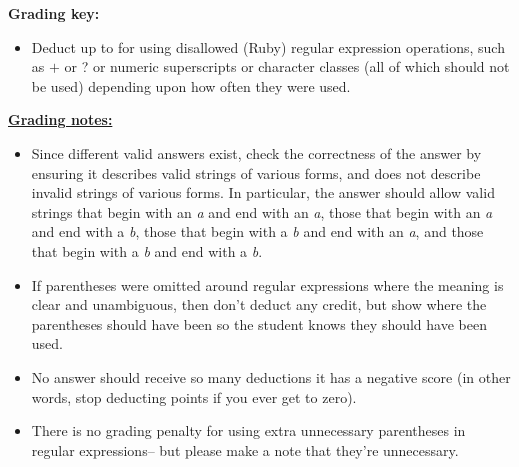 \documentclass[11pt,fleqn]{article}
\begin{document}
\begin{enumerate}
\begin{info}{\textbf{Grading key:}}
\begin{itemize}
              \item Deduct up to  for using disallowed (Ruby)
                    regular expression operations, such as $+$ or ? or
                    numeric superscripts or character classes (all of which
                    should not be used) depending upon how often they were
                    used.

            \end{itemize}

          \end{info}

          \begin{info}{\textbf{\underline{Grading notes:}}}

            \begin{itemize}

              \addtolength{\itemsep}{2mm}

              \item Since different valid answers exist, check the
                    correctness of the answer by ensuring it describes valid
                    strings of various forms, and does not describe invalid
                    strings of various forms.  In particular, the answer
                    should allow valid strings that begin with an \emph{a}
                    and end with an \emph{a}, those that begin with an
                    \emph{a} and end with a \emph{b}, those that begin with
                    a \emph{b} and end with an \emph{a}, and those that
                    begin with a \emph{b} and end with a \emph{b}.

              \item If parentheses were omitted around regular expressions
                    where the meaning is clear and unambiguous, then don't
                    deduct any credit, but show where the parentheses should
                    have been so the student knows they should have been
                    used.

              \item No answer should receive so many deductions it has a
                    negative score (in other words, stop deducting points if
                    you ever get to zero).

              \item There is no grading penalty for using extra unnecessary
                    parentheses in regular expressions-- but please make a
                    note that they're unnecessary.


\end{itemize}
\end{info}
\end{enumerate}
\end{document}
